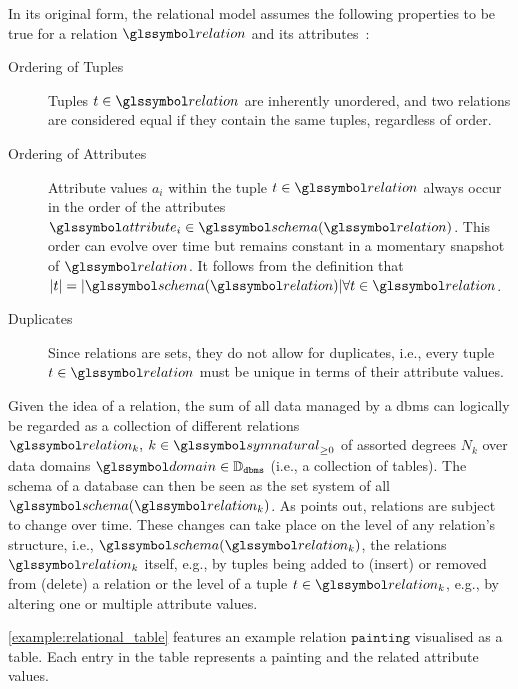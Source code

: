 In its original form, the relational model assumes the following properties to be true for a relation $\relation$ and its attributes~\cite{Codd:1970Relational}:

\begin{description}
    \item[Ordering of Tuples] Tuples $t \in \relation$ are inherently unordered, and two relations are considered equal if they contain the same tuples, regardless of order.
    \item[Ordering of Attributes] Attribute values $a_{i}$ within the tuple $t \in \relation$ always occur in the order of the attributes $\attribute_i \in \schema(\relation)$. This order can evolve over time but remains constant in a momentary snapshot of $\relation$. It follows from the definition that $|t| = |\schema(\relation)| \forall t \in \relation$.
    \item[Duplicates] Since relations are sets, they do not allow for duplicates, i.e., every tuple $t \in \relation$ must be unique in terms of their attribute values.
\end{description}

Given the idea of a relation, the sum of all data managed by a \acrshort{dbms} can logically be regarded as a collection of different relations $\relation_k, \: k \in \symnatural_{\geq 0}$ of assorted degrees $N_k$ over data domains $\domain \in \mathbb{D}_{\mathtt{dbms}}$ (i.e., a collection of tables). The schema of a database can then be seen as the set system of all $\schema(\relation_k)$. As \cite{Codd:1970Relational} points out, relations are subject to change over time. These changes can take place on the level of any relation's structure, i.e., $\schema(\relation_k)$, the relations $\relation_k$ itself, e.g., by tuples being added to (insert) or removed from (delete) a relation or the level of a tuple $t \in \relation_k$, e.g., by altering one or multiple attribute values.

\cref{example:relational_table} features an example relation $\mathtt{painting}$ visualised as a table. Each entry in the table represents a painting and the related attribute values.

